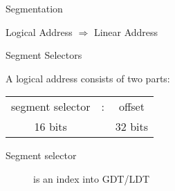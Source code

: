 \begin{frame}
  \begin{center}
  \end{center}
\end{frame}

\begin{frame}{Segmentation}
  \begin{block}{Logical Address $\Rightarrow$ Linear Address}
    \begin{center}
    \end{center}
  \end{block}
\end{frame}

\begin{frame}{Segment Selectors}
  \begin{block}{A logical address consists of two parts:}
    \begin{center}
      \begin{tabular}{ccc}
        segment selector&:&offset\\
        {\scriptsize 16 bits}&&{\scriptsize 32 bits}
      \end{tabular}
    \end{center}
  \end{block}
  \vspace{1em}
  \begin{description}
  \item[Segment selector] is an index into GDT/LDT
  \end{description}
    \begin{center}
    \end{center}
\end{frame}

